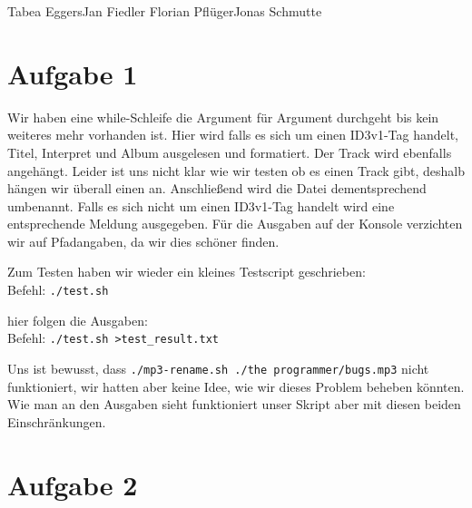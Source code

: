 \documentclass{ti2}
\begin{document}
%
                {Tabea Eggers}{Jan Fiedler}%
                {Florian Pflüger}{Jonas Schmutte}%


\section*{Aufgabe 1}
Wir haben eine while-Schleife die Argument für Argument durchgeht bis kein weiteres mehr vorhanden ist. Hier wird falls es sich um einen ID3v1-Tag handelt, Titel, Interpret und Album ausgelesen und formatiert. Der Track wird ebenfalls angehängt. Leider ist uns nicht klar wie wir testen ob es einen Track gibt, deshalb hängen wir überall einen an. Anschließend wird die Datei dementsprechend umbenannt. Falls es sich nicht um einen ID3v1-Tag handelt wird eine entsprechende Meldung ausgegeben. Für die Ausgaben auf der Konsole verzichten wir auf Pfadangaben, da wir dies schöner finden.


Zum Testen haben wir wieder ein kleines Testscript geschrieben:\\
Befehl: \texttt{./test.sh}

hier folgen die Ausgaben:\\
Befehl: \texttt{./test.sh >test\_result.txt}

Uns ist bewusst, dass \texttt{./mp3-rename.sh ./the\ programmer/bugs.mp3} nicht funktioniert, wir hatten aber keine Idee, wie wir dieses Problem beheben könnten. Wie man an den Ausgaben sieht funktioniert unser Skript aber mit diesen beiden Einschränkungen.



\section*{Aufgabe 2}
\newcommand{\0}{\textbackslash0}
\end{document}
